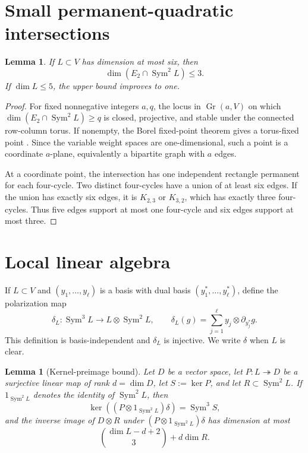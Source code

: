 \documentclass[11pt]{amsart}
\newcommand{\Sym}{\operatorname{Sym}}
\newtheorem{lemma}[theorem]{Lemma}
\theoremstyle{definition}
\begin{document}
\section{Small permanent-quadratic intersections}

\begin{lemma}\label{lem:small-intersection}
If \(L\subset V\) has dimension at most six, then
\[
 \dim(E_2\cap\Sym^2L)\le3.
\]
If \(\dim L\le5\), the upper bound improves to one.
\end{lemma}

\begin{proof}
For fixed nonnegative integers \(a,q\), the locus in
\(\operatorname{Gr}(a,V)\) on which
\(\dim(E_2\cap\Sym^2L)\ge q\) is closed, projective, and stable under the
connected row-column torus. If nonempty, the Borel fixed-point theorem gives
a torus-fixed point \cite[Chapter~I, Theorem~4.7]{Borel1991}. Since the
variable weight spaces are one-dimensional,
such a point is a coordinate \(a\)-plane, equivalently a bipartite graph with
\(a\) edges.

At a coordinate point, the intersection has one independent rectangle
permanent for each four-cycle. Two distinct four-cycles have a union of at
least six edges. If the union has exactly six edges, it is \(K_{2,3}\) or
\(K_{3,2}\), which has exactly three four-cycles. Thus five edges support at
most one four-cycle and six edges support at most three.
\end{proof}

\section{Local linear algebra}\label{sec:local-linear-algebra}

If \(L\subset V\) and \((y_1,\ldots,y_\ell)\) is a basis with dual basis
\((y_1^*,\ldots,y_\ell^*)\), define the polarization map
\[
 \delta_L:\Sym^3L\longrightarrow L\otimes\Sym^2L,
 \qquad \delta_L(g)=\sum_{j=1}^{\ell}y_j\otimes\partial_{y_j^*}g.
\]
This definition is basis-independent and \(\delta_L\) is injective. We write
\(\delta\) when \(L\) is clear.

\begin{lemma}[Kernel-preimage bound]\label{lem:kernel-preimage}
Let \(D\) be a vector space, let \(P:L\twoheadrightarrow D\) be a surjective
linear map of rank \(d=\dim D\), let \(S:=\ker P\), and let
\(R\subset\Sym^2L\). If \(1_{\Sym^2L}\) denotes the identity of
\(\Sym^2L\), then
\[
 \ker((P\otimes1_{\Sym^2L})\delta)=\Sym^3S,
\]
and the inverse image of \(D\otimes R\) under
\((P\otimes1_{\Sym^2L})\delta\) has dimension at most
\[
 \boxed{\binom{\dim L-d+2}{3}+d\dim R.} \tag{3.1}
\]
\end{lemma}
\end{document}
